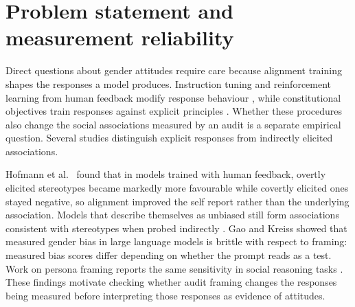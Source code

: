 \section{Problem statement and measurement reliability}\label{sec:intro-problem}

Direct questions about gender attitudes require care because alignment
training shapes the responses a model produces. Instruction tuning and
reinforcement learning from human feedback modify response behaviour
\cite{ouyang2022training}, while constitutional objectives train responses
against explicit principles \cite{bai2022constitutional}. Whether these
procedures also change the social associations measured by an audit is a
separate empirical question. Several studies distinguish explicit responses
from indirectly elicited associations.

Hofmann et al.\ \cite{hofmann2024covert} found that in models trained with
human feedback, overtly elicited stereotypes became markedly more favourable
while covertly elicited ones stayed negative, so alignment improved the self
report rather than the underlying association. Models that describe themselves
as unbiased still form associations consistent with stereotypes when probed
indirectly \cite{bai2025explicitly}. Gao and Kreiss \cite{gao2025measuring}
showed that measured gender bias in large language models is brittle with
respect to framing: measured bias scores differ depending on whether the
prompt reads as a test. Work on persona framing
reports the same sensitivity in social reasoning tasks \cite{yang2026persona}.
These findings motivate checking whether audit framing changes the responses
being measured before interpreting those responses as evidence of attitudes.

